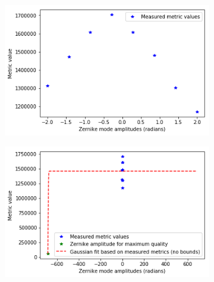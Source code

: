 \begin{figure}[h]
	\centering
	\begin{subfigure}{0.48\textwidth}
		\centering
		\includegraphics[width=\linewidth]{images/zernike_fitting_only_current_power_metric_no_fit_2.png}
		\caption{}
		\label{fig:zernike_fitting_only_current_power_metric_no_fit_2}
	\end{subfigure}
	\begin{subfigure}{0.48\textwidth}
		\centering
		\includegraphics[width=\linewidth]{images/zernike_fitting_current_power_metric_no_bound_2.png}
		\caption{}
		\label{fig:zernike_fitting_current_power_metric_no_bound_2}
	\end{subfigure}
	

\end{figure}
